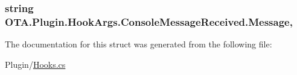 \subsubsection[{Message}]{\setlength{\rightskip}{0pt plus 5cm}string O\+T\+A.\+Plugin.\+Hook\+Args.\+Console\+Message\+Received.\+Message\hspace{0.3cm}{\ttfamily [get]}, {\ttfamily [set]}}\label{struct_o_t_a_1_1_plugin_1_1_hook_args_1_1_console_message_received_a8db7928d2daf448f5eb71297db8bb327}


The documentation for this struct was generated from the following file\+:\begin{DoxyCompactItemize}
\item 
Plugin/\hyperlink{_hooks_8cs}{Hooks.\+cs}\end{DoxyCompactItemize}
